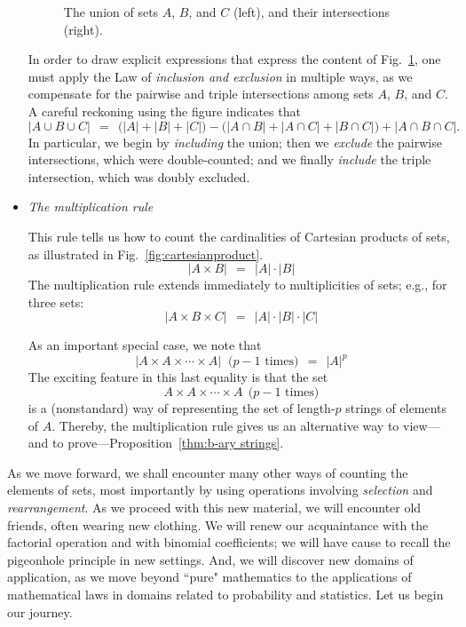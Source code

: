 \begin{itemize}
\begin{figure}[htb]
\begin{center}
        \caption{The union of sets $A$, $B$, and $C$ (left), and their intersections (right).}
        \label{fig:unionSets}
\end{center}
\end{figure}
In order to draw explicit expressions that express the content of  Fig.~\ref{fig:unionSets}, one must apply the Law of
{\em inclusion and exclusion} in multiple ways, as we compensate for the 
pairwise and triple intersections among  sets $A$, $B$, and $C$.  A careful reckoning using the figure 
indicates that
\[ |A \cup B \cup C| \ \ = \ \ 
\big(|A| + |B| + |C| \big) - \big( |A \cap B| + |A \cap C| + |B \cap C| \big) + |A \cap B \cap C|. \]
In particular, we begin by {\em including} the union; then we {\em exclude} the pairwise intersections, which
were double-counted; and we finally {\em include} the triple intersection, which was doubly excluded.

\item
{\em The multiplication rule} 

This rule tells us how to count the cardinalities of Cartesian products of sets, as
illustrated in Fig.~\ref{fig:cartesianproduct}.
\[ |A \times B| \ \ = \ \ |A| \cdot |B| \]
The multiplication rule extends immediately to multiplicities of sets; e.g., for three sets:
\[  |A \times B \times C| \ \ = \ \ |A| \cdot |B| \cdot |C| \]

As an important special case, we note that
\[ |A \times A \times \cdots  \times A| \ \mbox{ ($p-1$ times)}  \ \ = \ \ |A|^p \]
The exciting feature in this last equality is that the set
 \[ A \times A \times \cdots  \times A  ~~\mbox{($p-1$ times)} \]
is a (nonstandard) way of representing the set of length-$p$ strings of elements of $A$.
Thereby, the multiplication rule gives us an alternative way to 
view---and to prove---Proposition~\ref{thm:b-ary strings}.
\end{itemize}

\bigskip

As we move forward, we shall encounter many other ways of counting the elements of sets,
most importantly by using operations involving {\it selection} and {\it rearrangement}.  As we
proceed with this new material, we will encounter old friends, often wearing new clothing.  We
will renew our acquaintance with the factorial operation and with binomial coefficients; we will
have cause to recall the pigeonhole principle in new settings.  And, we will discover new domains
of application, as we move beyond ``pure" mathematics to the applications of mathematical
laws in domains related to probability and statistics.
Let us begin our journey.

